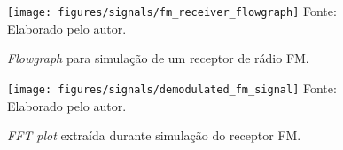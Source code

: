 \documentclass[
  12pt,				%
  openright,			%
  twoside,			%
  a4paper,			%
  english,			%
  french,				%
  spanish,			%
  brazil,				%
  ]{abntex2}
\begin{document}
\begin{figure}[!htb]
  \centering
  \caption{\textit{Flowgraph} para simulação de um receptor de rádio FM.}
  \texttt{[image: figures/signals/fm\_receiver\_flowgraph]}
  \label{fig:gnuradio_fm_receiver_flowgraph}
  Fonte: Elaborado pelo autor.
  \label{fig:gnuradio_signals_fm_receiver_flowgraph}
\end{figure}

\begin{figure}[!htb]
  \centering
  \caption{\textit{FFT plot} extraída durante simulação do receptor FM.}
  \texttt{[image: figures/signals/demodulated\_fm\_signal]}
  \label{fig:gnuradio_demodulated_fm_signal}
  Fonte: Elaborado pelo autor.
  \label{fig:gnuradio_signals_demodulated_fm_signal}
\end{figure}














\end{document}

